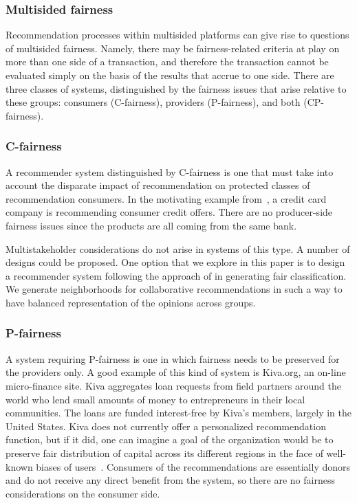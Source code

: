\subsubsection{Multisided fairness}
Recommendation processes within multisided platforms can give rise to questions of multisided fairness. Namely, there may be fairness-related criteria at play on more than one side of a transaction, and therefore the transaction cannot be evaluated simply on the basis of the results that accrue to one side. There are three classes of systems, distinguished by the fairness issues that arise relative to these groups: consumers (C-fairness), providers (P-fairness), and both (CP-fairness).

\subsubsection{C-fairness}

A recommender system distinguished by C-fairness is one that must take into account the disparate impact of recommendation on protected classes of recommendation consumers. In the motivating example from~\cite{fairness}, a credit card company is recommending consumer credit offers. There are no producer-side fairness issues since the products are all coming from the same bank. 

Multistakeholder considerations do not arise in systems of this type. A number of designs could be proposed. One option that we explore in this paper is to design a recommender system following the approach of \cite{zemel2013learning} in generating fair classification. We generate neighborhoods for collaborative recommendations in such a way to have balanced representation of the opinions across groups. 

\subsubsection{P-fairness}

A system requiring P-fairness is one in which fairness needs to be preserved for the providers only. A good example of this kind of system is Kiva.org, an on-line micro-finance site. Kiva aggregates loan requests from field partners around the world who lend small amounts of money to entrepreneurs in their local communities. The loans are funded interest-free by Kiva's members, largely in the United States. Kiva does not currently offer a personalized recommendation function, but if it did, one can imagine a goal of the organization would be to preserve fair distribution of capital across its different regions in the face of well-known biases of users~\cite{lee2014fairness}. Consumers of the recommendations are essentially donors and do not receive any direct benefit from the system, so there are no fairness considerations on the consumer side. 

